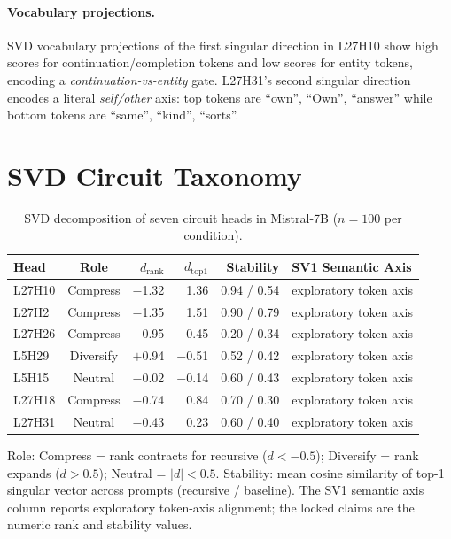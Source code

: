 \documentclass{article}
\newcommand{\dcohen}{d}
\begin{document}
\paragraph{Vocabulary projections.}
SVD vocabulary projections of the first singular direction in L27H10 show high scores for
continuation/completion tokens and low scores for entity tokens, encoding a
\emph{continuation-vs-entity} gate.
L27H31's second singular direction encodes a literal \emph{self/other} axis:
top tokens are ``own'', ``Own'', ``answer'' while bottom tokens are ``same'', ``kind'', ``sorts''.


\section{SVD Circuit Taxonomy}
\label{app:svd_taxonomy}

\begin{table}[ht]
\centering
\caption{SVD decomposition of seven circuit heads in Mistral-7B ($n = 100$ per condition).}
\label{tab:svd_heads}
\small
\begin{tabular}{lcrrrl}
\toprule
Head & Role & $\dcohen_{\text{rank}}$ & $\dcohen_{\text{top1}}$ & Stability & SV1 Semantic Axis \\
\midrule
L27H10 & Compress & $-$1.32 & 1.36 & 0.94 / 0.54 & exploratory token axis \\
L27H2  & Compress & $-$1.35 & 1.51 & 0.90 / 0.79 & exploratory token axis \\
L27H26 & Compress & $-$0.95 & 0.45 & 0.20 / 0.34 & exploratory token axis \\
L5H29  & Diversify & $+$0.94 & $-$0.51 & 0.52 / 0.42 & exploratory token axis \\
L5H15  & Neutral & $-$0.02 & $-$0.14 & 0.60 / 0.43 & exploratory token axis \\
L27H18 & Compress & $-$0.74 & 0.84 & 0.70 / 0.30 & exploratory token axis \\
L27H31 & Neutral & $-$0.43 & 0.23 & 0.60 / 0.40 & exploratory token axis \\
\bottomrule
\end{tabular}
\vspace{1mm}

\raggedright\footnotesize
Role: Compress = rank contracts for recursive ($\dcohen < -0.5$);
Diversify = rank expands ($\dcohen > 0.5$);
Neutral = $|\dcohen| < 0.5$.
Stability: mean cosine similarity of top-1 singular vector across prompts (recursive / baseline).
The SV1 semantic axis column reports exploratory token-axis alignment; the locked claims are the numeric rank and stability values.
\end{table}
\end{document}
